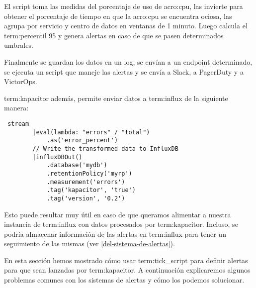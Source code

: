 El script toma las medidas del porcentaje de uso de \gls{acro:cpu}, las
invierte para obtener el porcentaje de tiempo en que la \gls{acro:cpu} se
encuentra ociosa, las agrupa por servicio y centro de datos en ventanas de 1
minuto. Luego calcula el \gls{term:percentil} 95 y genera alertas en caso de
que se pasen determinados umbrales.

Finalmente se guardan los datos en un log, se envían a un endpoint determinado,
se ejecuta un script que maneje las alertas y se envía a Slack, a PagerDuty y a
VictorOps.

\gls{term:kapacitor} además, permite enviar datos a \gls{term:influx} de la
siguiente manera:

\begin{lstlisting}
 stream
        |eval(lambda: "errors" / "total")
            .as('error_percent')
        // Write the transformed data to InfluxDB
        |influxDBOut()
            .database('mydb')
            .retentionPolicy('myrp')
            .measurement('errors')
            .tag('kapacitor', 'true')
            .tag('version', '0.2')
\end{lstlisting}


Esto puede resultar muy útil en caso de que queramos alimentar a nuestra
instancia de \gls{term:influx} con datos procesados por \gls{term:kapacitor}.
Incluso, se podría almacenar información de las alertas en \gls{term:influx}
para tener un seguimiento de las mismas (ver \autoref{del-sistema-de-alertas}).

En esta sección hemos mostrado cómo usar \gls{term:tick_script} para definir
alertas para que sean lanzadas por \gls{term:kapacitor}. A continuación
explicaremos algunos problemas comunes con los sistemas de alertas y cómo los
podemos solucionar.
